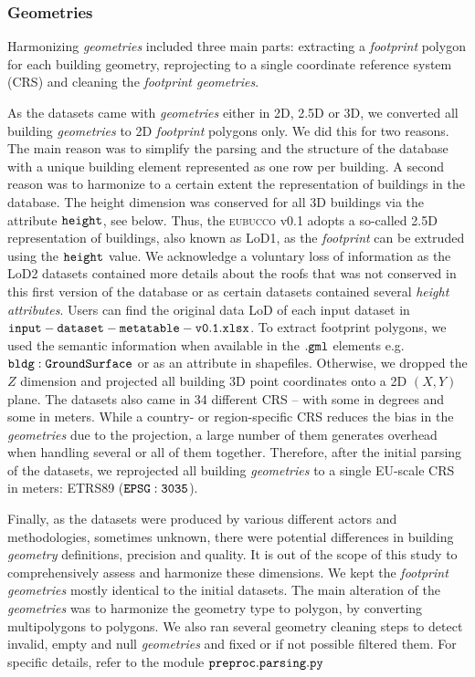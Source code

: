 \documentclass[fleqn,10pt]{wlscirep}
\begin{document}
\subsubsection*{Geometries} Harmonizing \textit{geometries} included three main parts: extracting a \textit{footprint} polygon for each building geometry, reprojecting to a single coordinate reference system (CRS) and cleaning the \textit{footprint geometries}.

As the datasets came with \textit{geometries} either in 2D, 2.5D or 3D, we converted all building \textit{geometries} to 2D \textit{footprint} polygons only. We did this for two reasons. The main reason was to simplify the parsing and the structure of the database with a unique building element represented as one row per building. A second reason was to harmonize to a certain extent the representation of buildings in the database. The height dimension was conserved for all 3D buildings via the attribute $\tt{height}$, see below. Thus, the \textsc{eubucco} v0.1 adopts a so-called 2.5D representation of buildings, also known as LoD1, as the \textit{footprint} can be extruded using the $\tt{height}$ value. We acknowledge a voluntary loss of information as the LoD2 datasets contained more details about the roofs that was not conserved in this first version of the database or as certain datasets contained several \textit{height} \textit{attributes}. Users can find the original data LoD of each input dataset in ${\tt input-dataset-metatable-v0.1.xlsx}$. To extract footprint polygons, we used the semantic information when available in the $\tt{.gml}$ elements e.g. $\tt{bldg:GroundSurface}$ or as an attribute in shapefiles. Otherwise, we dropped the $Z$ dimension and projected all building 3D point coordinates onto a 2D $(X,Y)$ plane. 
The datasets also came in 34 different CRS -- with some in degrees and some in meters. While a country- or region-specific CRS reduces the bias in the \textit{geometries} due to the projection, a large number of them generates overhead when handling several or all of them together. Therefore, after the initial parsing of the datasets, we reprojected all building \textit{geometries} to a single EU-scale CRS in meters: ETRS89 ($\tt{EPSG:3035}$).

Finally, as the datasets were produced by various different actors and methodologies, sometimes unknown, there were potential differences in building \textit{geometry} definitions, precision and quality. It is out of the scope of this study to comprehensively assess and harmonize these dimensions. We kept the \textit{footprint} \textit{geometries} mostly identical to the initial datasets. The main alteration of the \textit{geometries} was to harmonize the geometry type to polygon, by converting multipolygons to polygons. We also ran several geometry cleaning steps to detect invalid, empty and null \textit{geometries} and fixed or if not possible filtered them. For specific details, refer to the module $\tt{preproc.parsing.py}$ \cite{eubucco-0.1-code2022}
\end{document}
